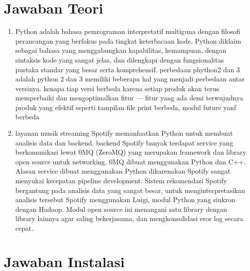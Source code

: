 \section{Jawaban Teori}
\begin{enumerate}
    \item Python adalah bahasa pemrograman interpretatif multiguna dengan filosofi perancangan yang berfokus pada tingkat keterbacaan kode. Python diklaim sebagai bahasa yang menggabungkan kapabilitas, kemampuan, dengan sintaksis kode yang sangat jelas, dan dilengkapi dengan fungsionalitas pustaka standar yang besar serta komprehensif. perbedaan phython2 dan 3 adalah python 2 dan 3 memiliki beberapa hal yang menjadi  perbedaan antar versinya. kenapa tiap versi berbeda karena setiap produk akan terus memperbaiki dan mengoptimalkan fitur — fitur yang ada demi terwujudnya produk yang efektif seperti tampilan file print berbeda, modul future yanf berbeda
    
    \item  layanan musik streaming Spotify memanfaatkan Python untuk membuat analisis data dan backend. backend Spotify banyak terdapat service yang berkomunikasi lewat 0MQ (ZeroMQ) yang merupakan framework dan library open source untuk networking. 0MQ dibuat menggunakan Python dan C++. Alasan service dibuat menggunakan Python dikarenakan Spotify sangat menyukai kecepatan pipeline development. Sistem rekomendasi Spotify bergantung pada analisis data yang sangat besar, untuk menginterpretasikan analisis tersebut Spotify menggunakan Luigi, modul Python yang sinkron dengan Hadoop. Modul open source ini menangani satu library dengan library lainnya agar saling bekerjasama, dan mengkonsolidasi eror log secara cepat.

\end{enumerate}




\section{Jawaban Instalasi}

